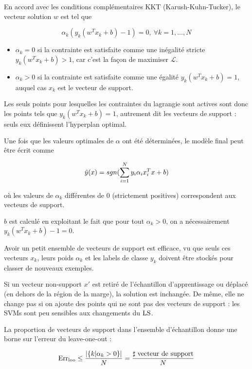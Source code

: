 	En accord avec les conditions complémentaires KKT (Karush-Kuhn-Tucker), le vecteur solution $w$ est tel que
	
	$$\alpha_k (y_k (w^T x_k + b) - 1) = 0, \: \forall k = 1, \dots , N$$
	
	\begin{itemize}
		\item $\alpha_k = 0$ si la contrainte est satisfaite comme une inégalité stricte $y_k (w^T x_k + b) > 1$, car c'est la façon de maximiser $\mathcal{L}$.
		
		\item $\alpha_k > 0$ si la contrainte est satisfaite comme une égalité $y_k(w^Tx_k + b) = 1$, auquel cas $x_k$ est le vecteur de support.
	\end{itemize}
	
	Les seuls points pour lesquelles les contraintes du lagrangie sont actives sont donc les points tels que $y_k (w^T x_k + b) = 1$, autrement dit les vecteurs de support : seuls eux définissent l'hyperplan optimal.
	
	Une fois que les valeurs optimales de $\alpha$ ont été déterminées, le modèle final peut être écrit comme
	
	$$\hat{y}(x) = sgn(\sum_{i= 1}^N y_i \alpha_i x_i^T x + b)$$
	
	où les valeurs de $\alpha_k$ différentes de 0 (strictement positives) correspondent aux vecteurs de support.
	
	$b$ est calculé en exploitant le fait que pour tout $\alpha_k > 0$, on a nécessairement $y_k(w^Tx_k + b) - 1 = 0$.
	
	
	Avoir un petit ensemble de vecteurs de support est efficace, vu que seuls ces vecteurs $x_k$, leurs poids $\alpha_k$ et les labels de classe $y_k$ doivent être stockés pour classer de nouveaux exemples.
	
	Si un vecteur non-support $x'$ est retiré de l'échantillon d'apprentissage ou déplacé (en dehors de la région de la marge), la solution est inchangée. De même, elle ne change pas si on ajoute des points qui ne sont pas des vecteurs de support : les SVMs sont peu sensibles aux changements du $\text{LS}$.
	
	La proportion de vecteurs de support dans l'ensemble d'échantillon donne une borne sur l'erreur du leave-one-out :
	
	$$\text{Err}_\text{loo} \leq \frac{\vert \lbrace k \vert \alpha_k > 0 \rbrace \vert}{N} = \frac{\sharp \text{ vecteur de support}}{N}$$
	

